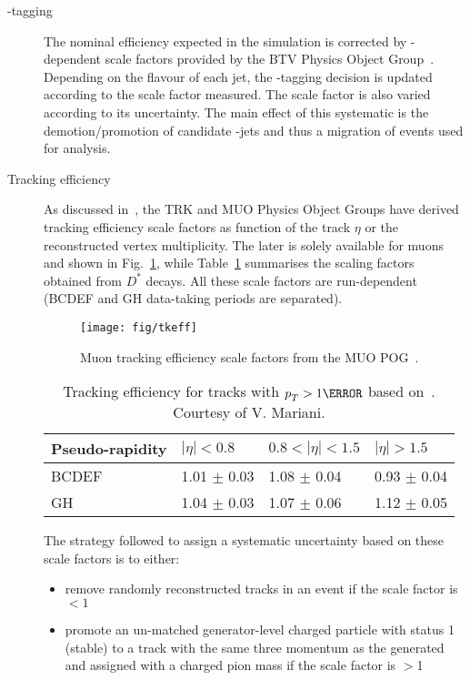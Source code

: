 \begin{description}
\item[\cPqb-tagging] The nominal efficiency expected in the simulation is corrected by \pt-dependent scale factors provided by the BTV Physics Object Group~\cite{twiki:BTV}. Depending on the flavour of each jet, the \cPqb-tagging decision is updated according to the scale factor measured. The scale factor is also varied according to its uncertainty. The main effect of this systematic is the demotion/promotion of candidate \cPqb-jets and thus a migration of events used for analysis.

\item[Tracking efficiency]
As discussed in~\cite{CMS-AN-2017-175}, the TRK and MUO Physics Object Groups have derived tracking efficiency scale factors as function of the track $\eta$ or the reconstructed vertex multiplicity. The later is solely available for muons and shown in Fig.~\ref{fig:mutksf}, while Table~\ref{tab:dstartsf} summarises the scaling factors obtained from $D^*$ decays. All these scale factors are run-dependent (BCDEF and GH data-taking periods are separated).

\begin{figure}[htp]
  \centering
  \texttt{[image: fig/tkeff]}%
  \caption{Muon tracking efficiency scale factors from the MUO POG~\cite{twiki:MUO}.}
  \label{fig:mutksf}
\end{figure}

\begin{table}[htb]
\begin{center}
\caption{Tracking efficiency for tracks with $\pt>1\GeV$ based on~\cite{CMS-AN-2015-048,twiki:trkpogeff,CMS-DP-2016-012}.
Courtesy of V. Mariani.}
\label{tab:dstartsf}
\begin{tabular}{llll}
\hline
Pseudo-rapidity & $|\eta|<0.8$ & $0.8<|\eta|<1.5$ & $|\eta|>1.5$ \\
\hline
BCDEF & 1.01 $\pm$ 0.03 & 1.08 $\pm$ 0.04 & 0.93 $\pm$ 0.04 \\
GH & 1.04 $\pm$ 0.03 & 1.07 $\pm$ 0.06 & 1.12 $\pm$ 0.05 \\
\hline
\end{tabular}
\end{center}
\end{table}
The strategy followed to assign a systematic uncertainty based on these scale factors is to either:

\begin{itemize}
\item remove randomly reconstructed tracks in an event if the scale factor is $<1$
\item promote an un-matched generator-level charged particle with status 1 (stable) to a track with the same
three momentum as the generated and assigned with a charged pion mass if the scale factor is $>$1
\end{itemize}


\end{description}
